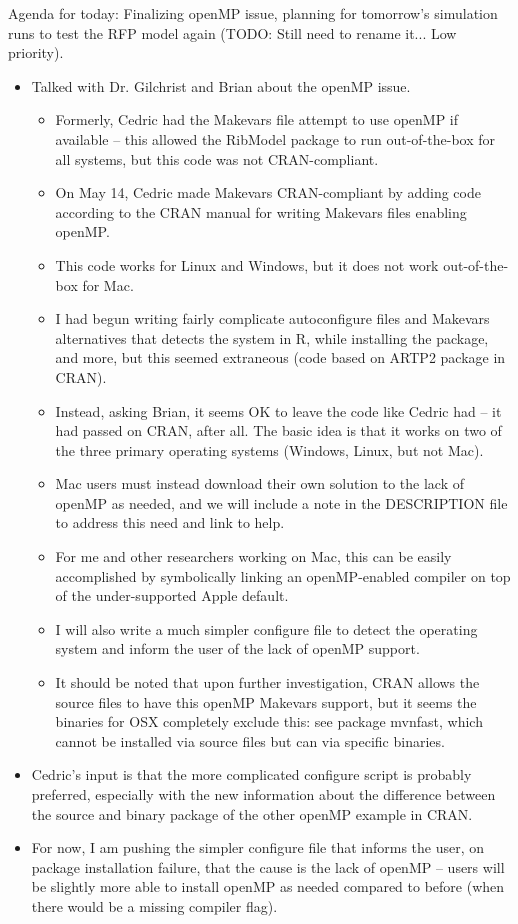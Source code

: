 \documentclass[12pt,hyperref]{labbook}
\begin{document}

Agenda for today: Finalizing openMP issue, planning for tomorrow's simulation runs to test the RFP model again (TODO: Still need to rename it... Low priority).

\begin{itemize}
    \item Talked with Dr. Gilchrist and Brian about the openMP issue.
    \begin{itemize}
        \item Formerly, Cedric had the Makevars file attempt to use openMP if available -- this allowed the RibModel package to run out-of-the-box for all systems, but this code was not CRAN-compliant.
        \item On May 14, Cedric made Makevars CRAN-compliant by adding code according to the CRAN manual for writing Makevars files enabling openMP.
        \item This code works for Linux and Windows, but it does not work out-of-the-box for Mac.
        \item I had begun writing fairly complicate autoconfigure files and Makevars alternatives that detects the system in R, while installing the package, and more, but this seemed extraneous (code based on ARTP2 package in CRAN).
        \item Instead, asking Brian, it seems OK to leave the code like Cedric had -- it had passed on CRAN, after all. The basic idea is that it works on two of the three primary operating systems (Windows, Linux, but not Mac).
        \item Mac users must instead download their own solution to the lack of openMP as needed, and we will include a note in the DESCRIPTION file to address this need and link to help.
        \item For me and other researchers working on Mac, this can be easily accomplished by symbolically linking an openMP-enabled compiler on top of the under-supported Apple default.
        \item I will also write a much simpler configure file to detect the operating system and inform the user of the lack of openMP support.
        \item It should be noted that upon further investigation, CRAN allows the source files to have this openMP Makevars support, but it seems the binaries for OSX completely exclude this: see package mvnfast, which cannot be installed via source files but can via specific binaries.
    \end{itemize}
    \item Cedric's input is that the more complicated configure script is probably preferred, especially with the new information about the difference between the source and binary package of the other openMP example in CRAN.
    \item For now, I am pushing the simpler configure file that informs the user, on package installation failure, that the cause is the lack of openMP -- users will be slightly more able to install openMP as needed compared to before (when there would be a missing compiler flag).
\end{itemize}
\end{document}
